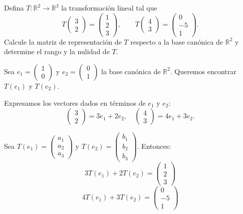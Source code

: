 \begin{prob}
Defina $T: \mathbb{R}^2 \rightarrow \mathbb{R}^3$ la transformación lineal tal que
\[
T\begin{pmatrix} 3 \\ 2 \end{pmatrix} = \begin{pmatrix} 1 \\ 2 \\ 3 \end{pmatrix}, \qquad
T\begin{pmatrix} 4 \\ 3 \end{pmatrix} = \begin{pmatrix} 0 \\ -5 \\ 1 \end{pmatrix}.
\]
Calcule la matriz de representación de $T$ respecto a la base canónica de $\mathbb{R}^2$ y determine el rango y la nulidad de $T$.
\begin{myproof}
Sea $e_1 = \begin{pmatrix} 1 \\ 0 \end{pmatrix}$ y $e_2 = \begin{pmatrix} 0 \\ 1 \end{pmatrix}$ la base canónica de $\mathbb{R}^2$. Queremos encontrar $T(e_1)$ y $T(e_2)$.

Expresamos los vectores dados en términos de $e_1$ y $e_2$:
\[
\begin{pmatrix} 3 \\ 2 \end{pmatrix} = 3e_1 + 2e_2, \quad
\begin{pmatrix} 4 \\ 3 \end{pmatrix} = 4e_1 + 3e_2.
\]

Sea $T(e_1) = \begin{pmatrix} a_1 \\ a_2 \\ a_3 \end{pmatrix}$ y $T(e_2) = \begin{pmatrix} b_1 \\ b_2 \\ b_3 \end{pmatrix}$. Entonces:
\[
3T(e_1) + 2T(e_2) = \begin{pmatrix} 1 \\ 2 \\ 3 \end{pmatrix}
\]
\[
4T(e_1) + 3T(e_2) = \begin{pmatrix} 0 \\ -5 \\ 1 \end{pmatrix}
\]


\end{myproof}
\end{prob}

